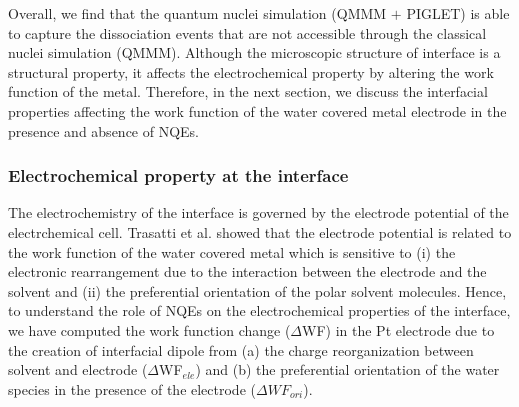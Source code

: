 Overall, we find that the quantum nuclei simulation (QMMM $+$ PIGLET) is able to capture the dissociation events that are not accessible through the classical nuclei simulation (QMMM). Although the microscopic structure of interface is a structural property, it affects the electrochemical property by altering the work function of the metal. Therefore, in the next section, we discuss the interfacial properties affecting the work function of the water covered metal electrode in the presence and absence of NQEs. 

\subsubsection{Electrochemical property at the interface}

The electrochemistry of the interface is governed by the electrode potential of the electrchemical cell. Trasatti et al.\cite{trasatti1983structuring} showed that the electrode potential is related to the work function of the water covered metal which is sensitive to (i) the electronic rearrangement due to the interaction between the electrode and the solvent and (ii) the preferential orientation of the polar solvent molecules. Hence, to understand the role of NQEs on the electrochemical properties of the interface, we have computed the work function change ($\Delta$WF) in the Pt electrode due to the creation of interfacial dipole from (a) the charge reorganization between solvent and electrode ($\Delta$WF$_{ele}$) and (b) the preferential orientation of the water species in the presence of the electrode ($\Delta WF_{ori}$).


